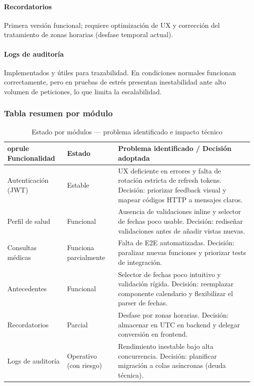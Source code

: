 \documentclass[a4paper,11pt]{article}
\begin{document}
\paragraph{Recordatorios} Primera versión funcional; requiere optimización de UX y corrección del tratamiento de zonas horarias (desfase temporal actual).

\paragraph{Logs de auditoría} Implementados y útiles para trazabilidad. En condiciones normales funcionan correctamente, pero en pruebas de estrés presentan inestabilidad ante alto volumen de peticiones, lo que limita la escalabilidad.

\subsubsection*{Tabla resumen por módulo}
\begin{table}[ht]
\centering
\caption{Estado por módulos — problema identificado e impacto técnico}
\begin{tabularx}{\textwidth}{l l X}
	oprule
Funcionalidad & Estado & Problema identificado / Decisión adoptada \\
\midrule
Autenticación (JWT) & Estable & UX deficiente en errores y falta de rotación estricta de refresh tokens. Decisión: priorizar feedback visual y mapear códigos HTTP a mensajes claros. \\
Perfil de salud & Funcional & Ausencia de validaciones inline y selector de fechas poco usable. Decisión: rediseñar validaciones antes de añadir vistas nuevas. \\
Consultas médicas & Funciona parcialmente & Falta de E2E automatizadas. Decisión: paralizar nuevas funciones y priorizar tests de integración. \\
Antecedentes & Funcional & Selector de fechas poco intuitivo y validación rígida. Decisión: reemplazar componente calendario y flexibilizar el parser de fechas. \\
Recordatorios & Parcial & Desfase por zonas horarias. Decisión: almacenar en UTC en backend y delegar conversión en frontend. \\
Logs de auditoría & Operativo (con riesgo) & Rendimiento inestable bajo alta concurrencia. Decisión: planificar migración a colas asíncronas (deuda técnica). \\
\bottomrule
\end{tabularx}
\end{table}
\end{document}

